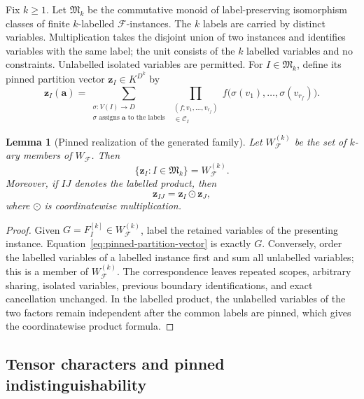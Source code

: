 \documentclass[11pt]{article}
\theoremstyle{plain}
\newtheorem{lemma}[lemma]{Lemma}
\theoremstyle{definition}
\theoremstyle{remark}
\newcommand{\cF}{\mathcal F}
\newcommand{\zvec}[1]{\mathbf z_{#1}}
\newcommand{\InstMonoid}[1]{\mathfrak M_{#1}}
\begin{document}
Fix $k\ge1$.  Let $\InstMonoid{k}$ be the commutative monoid of
label-preserving isomorphism classes of finite $k$-labelled $\cF$-instances.
The $k$ labels are carried by distinct variables.  Multiplication takes the
disjoint union of two instances and identifies variables with the same
label; the unit consists of the $k$ labelled variables and no constraints.
Unlabelled isolated variables are permitted.  For $I\in\InstMonoid{k}$,
define its pinned partition vector $\zvec I\in K^{D^k}$ by
\begin{equation}
  \zvec I(\mathbf a)
  =\sum_{\substack{\sigma:V(I)\to D\\
                    \sigma\text{ assigns }\mathbf a\text{ to the labels}}}
       \prod_{\substack{(f;v_1,\ldots,v_{r_f})\\
                         \in\mathcal C_I}}
          f\bigl(\sigma(v_1),\ldots,\sigma(v_{r_f})\bigr).
  \label{eq:pinned-partition-vector}
\end{equation}

\begin{lemma}[Pinned realization of the generated family]
\label{lem:pinned-realization}
Let $W_{\cF}^{(k)}$ be the set of $k$-ary members of $W_{\cF}$.  Then
\[
  \{\zvec I:I\in\InstMonoid{k}\}=W_{\cF}^{(k)}.
\]
Moreover, if $IJ$ denotes the labelled product, then
\[
  \zvec{IJ}=\zvec I\odot\zvec J,
\]
where $\odot$ is coordinatewise multiplication.
\end{lemma}

\begin{proof}
Given $G=F_I^{[k]}\in W_{\cF}^{(k)}$, label the retained variables of the
presenting instance.  Equation~\eqref{eq:pinned-partition-vector} is exactly
$G$.  Conversely, order the labelled variables of a labelled instance first
and sum all unlabelled variables; this is a member of $W_{\cF}^{(k)}$.
The correspondence leaves repeated scopes, arbitrary sharing, isolated
variables, previous boundary identifications, and exact cancellation
unchanged.  In the labelled product, the unlabelled variables of the two
factors remain independent after the common labels are pinned, which gives
the coordinatewise product formula.
\end{proof}

\subsection{Tensor characters and pinned indistinguishability}
\end{document}
